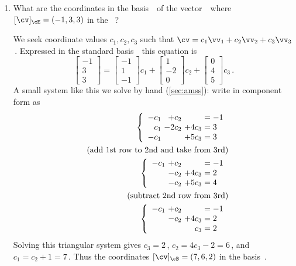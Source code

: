 \begin{example}
\begin{enumerate}
\item What are the coordinates in the basis~\cB\ of the vector~\cv\ where \([\cv]_\cE=(-1,3,3)\) in the ~\cE?
\begin{solution} 
We seek coordinate values \(c_1,c_2,c_3\) such that \(\cv=c_1\vv_1+c_2\vv_2+c_3\vv_3\)\,. 
Expressed in the standard basis~\cE\ this equation is
\begin{equation*}
\begin{bmatrix} -1\\3\\3 \end{bmatrix}=
\begin{bmatrix} -1\\1\\-1 \end{bmatrix}c_1+
\begin{bmatrix} 1\\-2\\0 \end{bmatrix}c_2+
\begin{bmatrix} 0\\4\\5 \end{bmatrix}c_3\,.
\end{equation*}
A small system like this we solve by hand (\autoref{sec:amss}): write in component form as
\begin{eqnarray*}
&&\left\{\begin{array}{r@{\ }r@{\ }r@{{}={}}l}  
-c_1&+c_2&&-1 \\
c_1&-2c_2&+4c_3&3 \\
-c_1&&+5c_3&3
\end{array}\right.
\\&&(\text{add 1st row to 2nd and take from 3rd})
\\&&\left\{\begin{array}{r@{\ }r@{\ }r@{{}={}}l}  
-c_1&+c_2&&-1 \\
&-c_2&+4c_3&2 \\
&-c_2&+5c_3&4
\end{array}\right.
\\&&(\text{subtract 2nd row from 3rd})
\\&&\left\{\begin{array}{r@{\ }r@{\ }r@{{}={}}l}  
-c_1&+c_2&&-1 \\
&-c_2&+4c_3&2 \\
&&c_3&2
\end{array}\right.
\end{eqnarray*}
Solving this triangular system gives \(c_3=2\)\,, \(c_2=4c_3-2=6\)\,, and \(c_1=c_2+1=7\)\,.
Thus the coordinates \([\cv]_\cB=(7,6,2)\) in the basis~\cB.
\end{solution}



\end{enumerate}
\end{example}
